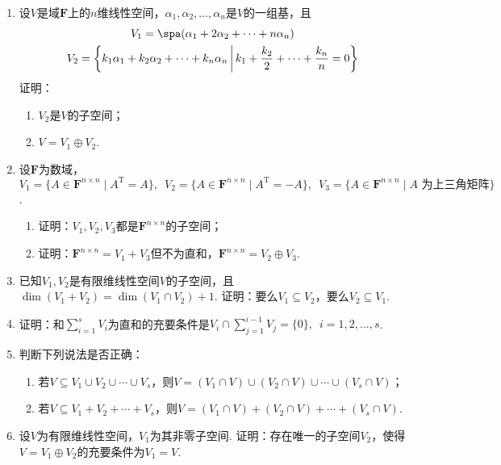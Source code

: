 \begin{enumerate}
    \item 设$V$是域$\mathbf{F}$上的$n$维线性空间，$\alpha_1,\alpha_2,\ldots,\alpha_n$是$V$的一组基，且
          \begin{gather*}
              V_1=\spa(\alpha_1+2\alpha_2+\cdots+n\alpha_n) \\
              V_2=\left\{k_1\alpha_1+k_2\alpha_2+\cdots+k_n\alpha_n \,\middle|\, k_1+\dfrac{k_2}{2}+\cdots+\dfrac{k_n}{n}=0\right\}
          \end{gather*}
          证明：
          \begin{enumerate}
              \item $V_2$是$V$的子空间；

              \item $V=V_1\oplus V_2$.
          \end{enumerate}

    \item 设$\mathbf{F}$为数域，$V_1=\{A\in\mathbf{F}^{n\times n} \mid A^\mathrm{T}=A\},\enspace
              V_2=\{A\in\mathbf{F}^{n\times n} \mid A^\mathrm{T}=-A\},\enspace V_3=\{A\in\mathbf{F}^{n\times n} \mid A\text{~为上三角矩阵}\}$.
          \begin{enumerate}
              \item 证明：$V_1,V_2,V_3$都是$\mathbf{F}^{n\times n}$的子空间；

              \item 证明：$\mathbf{F}^{n\times n}=V_1+V_3$但不为直和，$\mathbf{F}^{n\times n}=V_2\oplus V_3$.
          \end{enumerate}

    \item 已知$V_1,V_2$是有限维线性空间$V$的子空间，且$\dim(V_1+V_2)=\dim(V_1 \cap V_2)+1$. 证明：要么$V_1 \subseteq V_2$，要么$V_2 \subseteq V_1$.

    \item 证明：和$\sum\limits_{i=1}^{s}V_i$为直和的充要条件是$V_i \cap \sum\limits_{j=1}^{i-1}V_j=\{0\},\enspace i=1,2,\ldots,s$.

    \item 判断下列说法是否正确：
          \begin{enumerate}
              \item 若$V \subseteq V_1 \cup V_2 \cup \cdots \cup V_s$，则$V=(V_1 \cap V)\cup(V_2 \cap V)\cup\cdots\cup(V_s \cap V)$；

              \item 若$V \subseteq V_1+V_2+\cdots +V_s$，则$V=(V_1 \cap V)+(V_2 \cap V)+\cdots+(V_s \cap V)$.
          \end{enumerate}

    \item 设$V$为有限维线性空间，$V_1$为其非零子空间. 证明：存在唯一的子空间$V_2$，使得$V=V_1\oplus V_2$的充要条件为$V_1=V$.
\end{enumerate}

